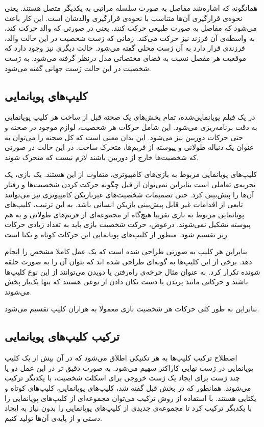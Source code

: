 همانگونه که اشاره‌‌شد مفاصل به صورت سلسله مراتبی به یکدیگر متصل هستند. یعنی نحوه‌ی 
قرارگیری آن‌ها متناسب با نحوه‌ی قرارگیری والدشان است.
این کار باعث می‌شود که مفاصل به صورت طبیعی حرکت کنند. یعنی در صورتی که والد حرکت کند، به واسطه‌ی 
آن فرزند نیز حرکت می‌کند.
زمانی که ژست شخصیت در این حالت والد، فرزندی قرار دارد به آن ژست محلی
گفته می‌شود. حالت دیگری نیز وجود دارد که موقعیت هر مفصل نسبت به فضای مختصاتی مدل 
درنظر گرفته می‌شود. به ژست شخصیت در این حالت ژست جهانی
گفته می‌شود.

\subsection{‌کلیپ‌های پویانمایی}

در یک فیلم پویانمایی‌شده، تمام بخش‌های یک صحنه قبل از ساخت هر کلیپ پویانمایی به دقت برنامه‌ریزی می‌شود.
این شامل حرکات هر شخصیت، لوازم موجود در صحنه و حتی حرکات دوربین نیز می‌شود.
این بدان معنی است که کل صحنه را می‌توان به عنوان یک دنباله طولانی و پیوسته از فریم‌ها، متحرک ساخت.
در این حالت در صورتی که شخصیت‌ها خارج از دوربین باشند لازم نیست که متحرک شوند.

کلیپ‌های پویانمایی مربوط به بازی‌های کامپیوتری، متفاوت از این هستند. یک بازی، یک تجربه‌ی تعاملی است بنابراین نمی‌توان از قبل چگونه حرکت کردن شخصیت‌ها و رفتار آن‌ها را پیش‌بینی کرد.
حتی تصمیمات شخصیت‌های غیربازیکن کامپیوتری نیز می‌توانند تابعی از اقدامات غیر قابل پیش‌بینی بازیکن انسانی باشد.
به این ترتیب، کلیپ‌های پویانمایی مربوط به بازی تقریبا هیچ‌گاه از مجموعه‌ای از فریم‌های طولانی و به هم پیوسته تشکیل نمی‌شوند.
درعوض، حرکت شخصیت بازی باید به تعداد زیادی حرکات ریز تقسیم شود. 
منظور از کلیپ‌های پویانمایی این حرکات کوتاه و یکتا است.

بنابراین هر کلیپ به صورتی طراحی شده است که یک عمل کاملا مشخص را انجام دهد. برخی از این کلیپ‌ها به گونه‌ای طراحی شده اند که بتوان آن را به صورت حلقه شونده تکرار کرد.
به عنوان مثال چرخه‌ی راه‌رفتن یا دویدن می‌توانند از این نوع کلیپ‌ها باشند
و حرکاتی مانند پریدن یا دست تکان دادن از نوعی هستند که تنها یک‌بار پخش می‌شوند.

بنابراین به طور کلی حرکات هر شخصیت بازی معمولا به هزاران کلیپ تقسیم می‌شود. \cite{GameEngineArchitecture}

\subsection{ترکیب کلیپ‌های پویانمایی}

اصطلاح ترکیب کلیپ‌ها به هر تکنیکی اطلاق می‌شود که در آن بیش از یک کلیپ پویانمایی در ژست نهایی کاراکتر سهیم می‌شود.
به صورت دقیق تر در این عمل دو یا چند ژست برای ایجاد یک ژست خروجی برای اسکلت شخصیت، با یکدیگر ترکیب می‌شوند.
همانطور که در بخش قبل گفته شد، کلیپ‌های پویانمایی، کلیپ‌های کوتاه و یکتایی هستند. با استفاده از روش ترکیب ‌می‌توان مجموعه‌ای از کلیپ‌های پویانمایی را با یکدیگر ترکیب کرد تا مجموعه‌ی جدیدی از کلیپ‌های پویانمایی را بدون نیاز به ایجاد دستی و از پایه‌ی آن‌ها تولید کنیم.

